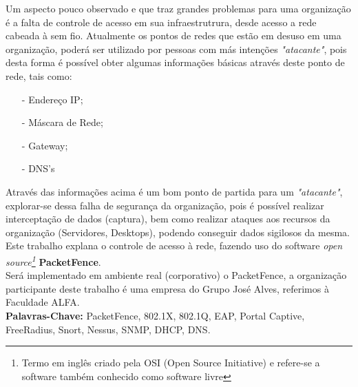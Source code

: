 \documentclass[brazil, ruledheader, pnumromarab,normaltoc]{abnt}
\begin{document}

\begin{resumo}

Um aspecto pouco observado e que traz grandes problemas para uma organização é a falta de controle de acesso em sua infraestrutrura, desde acesso a rede cabeada à sem fio. Atualmente os pontos de redes que estão em desuso em uma organização, poderá ser utilizado por pessoas com más intenções \emph{"atacante"}, pois desta forma é possível obter algumas informações básicas através deste ponto de rede, tais como:
\begin{enumerate}
\item[-]{Endereço IP};
\item[-]{Máscara de Rede};
\item[-]{Gateway};
\item[-]{DNS's}
\end{enumerate}
\par Através das informações acima é um bom ponto de partida para um \emph{"atacante"}, explorar-se dessa falha de segurança da organização, pois é possível realizar interceptação de dados (captura), bem como realizar ataques aos recursos da organização (Servidores, Desktops), podendo conseguir dados sigilosos da mesma. Este trabalho explana o controle de acesso à rede, fazendo uso do software \textit{open source\footnote{Termo em inglês criado pela OSI (Open Source Initiative) e refere-se a software também conhecido como software livre}} \textbf{PacketFence}.\\ Será implementado em ambiente real (corporativo) o PacketFence, a organização participante deste trabalho é uma empresa do Grupo José Alves, referimos à Faculdade ALFA.\\

\textbf{Palavras-Chave:} PacketFence, 802.1X, 802.1Q, EAP, Portal Captive, FreeRadius, Snort, Nessus, SNMP, DHCP, DNS.

\end{resumo}
\end{document}

